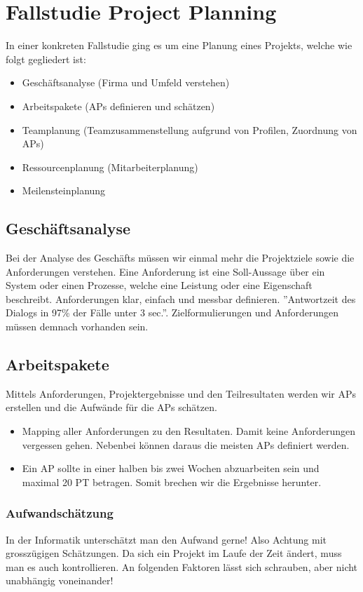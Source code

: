 \chapter{Fallstudie Project Planning}

In einer konkreten Fallstudie ging es um eine Planung eines Projekts, welche wie folgt gegliedert ist:

\begin{itemize}
	\item Geschäftsanalyse (Firma und Umfeld verstehen)
	\item Arbeitspakete (APs definieren und schätzen)
	\item Teamplanung (Teamzusammenstellung aufgrund von Profilen, Zuordnung von APs)
	\item Ressourcenplanung (Mitarbeiterplanung)
	\item Meilensteinplanung
\end{itemize}

\section{Geschäftsanalyse}
Bei der Analyse des Geschäfts müssen wir einmal mehr die Projektziele sowie die Anforderungen verstehen. Eine Anforderung ist eine Soll-Aussage über ein System oder einen Prozesse, welche eine Leistung oder eine Eigenschaft beschreibt. Anforderungen klar, einfach und messbar definieren. ''Antwortzeit des Dialogs in 97\% der Fälle unter 3 sec.''. Zielformulierungen und Anforderungen müssen demnach vorhanden sein.

\section{Arbeitspakete}
Mittels Anforderungen, Projektergebnisse und den Teilresultaten werden wir APs erstellen und die Aufwände für die APs schätzen.

\begin{itemize}
	\item Mapping aller Anforderungen zu den Resultaten. Damit keine Anforderungen vergessen gehen. Nebenbei können daraus die meisten APs definiert werden.
	\item Ein AP sollte in einer halben bis zwei Wochen abzuarbeiten sein und maximal 20 PT betragen. Somit brechen wir die Ergebnisse herunter. 
\end{itemize}

\subsection{Aufwandschätzung}
\label{sec:aufwandschaetzung}
In der Informatik unterschätzt man den Aufwand gerne! Also Achtung mit grosszügigen Schätzungen. Da sich ein Projekt im Laufe der Zeit ändert, muss man es auch kontrollieren. An folgenden Faktoren lässt sich schrauben, aber nicht unabhängig voneinander!

